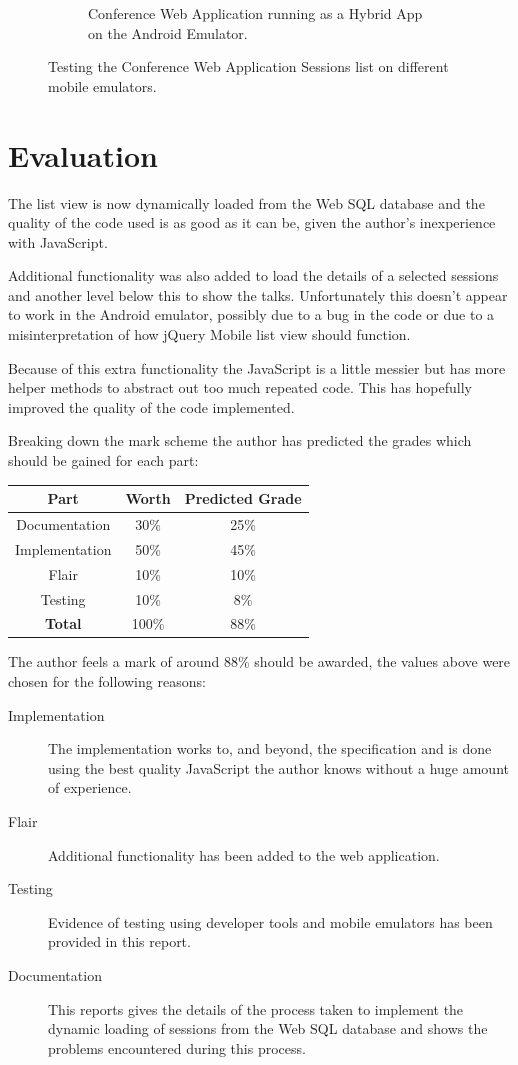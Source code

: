 \documentclass[10pt, a4paper]{article}
\begin{document}
\begin{figure}[h]
\begin{subfigure}[b]{0.4\textwidth}
\caption{Conference Web Application running as a Hybrid App on the Android
         Emulator.}
\end{subfigure}
\caption{Testing the Conference Web Application Sessions list on different
         mobile emulators.}
\label{fig:testing}
\end{figure}


\section{Evaluation}
The list view is now dynamically loaded from the Web SQL database and the
quality of the code used is as good as it can be, given the author's
inexperience with JavaScript.

Additional functionality was also added to load the details of a selected
sessions and another level below this to show the talks. Unfortunately this
doesn't appear to work in the Android emulator, possibly due to a bug in the
code or due to a misinterpretation of how jQuery Mobile list view should
function.

Because of this extra functionality the JavaScript is a little messier but has
more helper methods to abstract out too much repeated code. This has hopefully
improved the quality of the code implemented.

Breaking down the mark scheme the author has predicted the grades which should
be gained for each part:

\begin{table}[h]
\centering
\begin{tabular}{| c | c | c |}\hline
\textbf{Part}	& \textbf{Worth}	& \textbf{Predicted Grade} \\ \hline
Documentation	& 30\%			& 25\% \\ 
Implementation	& 50\%			& 45\% \\ 
Flair		& 10\%			& 10\% \\ 
Testing		& 10\%			& 8\% \\ \hline
\textbf{Total}	& 100\%			& 88\% \\ \hline
\end{tabular}
\end{table}

The author feels a mark of around 88\% should be awarded, the values above were
chosen for the following reasons:

\begin{description}
\item[Implementation] The implementation works to, and beyond, the
specification and is done using the best quality JavaScript the author knows
without a huge amount of experience.
\item[Flair] Additional functionality has been added to the web application.
\item[Testing] Evidence of testing using developer tools and mobile emulators
has been provided in this report.
\item[Documentation] This reports gives the details of the process taken to
implement the dynamic loading of sessions from the Web SQL database and shows
the problems encountered during this process.
\end{description}


\newpage


\end{document}
